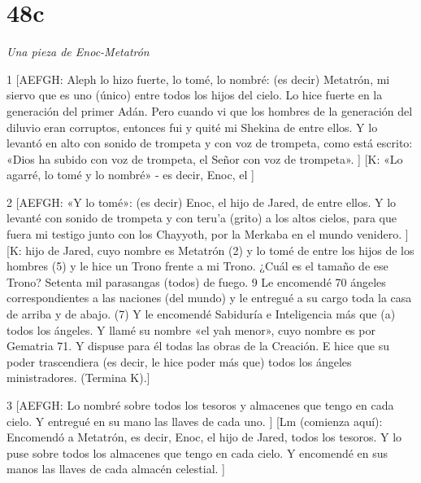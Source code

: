 \chapter{48c}

\par \textit{Una pieza de Enoc-Metatrón}

\par 1 [AEFGH: Aleph lo hizo fuerte, lo tomé, lo nombré: (es decir) Metatrón, mi siervo que es uno (único) entre todos los hijos del cielo. Lo hice fuerte en la generación del primer Adán. Pero cuando vi que los hombres de la generación del diluvio eran corruptos, entonces fui y quité mi Shekina de entre ellos. Y lo levantó en alto con sonido de trompeta y con voz de trompeta, como está escrito: «Dios ha subido con voz de trompeta, el Señor con voz de trompeta». ] [K: «Lo agarré, lo tomé y lo nombré» - es decir, Enoc, el ]


\par 2 [AEFGH: «Y lo tomé»: (es decir) Enoc, el hijo de Jared, de entre ellos. Y lo levanté con sonido de trompeta y con teru'a (grito) a los altos cielos, para que fuera mi testigo junto con los Chayyoth, por la Merkaba en el mundo venidero. ] [K: hijo de Jared, cuyo nombre es Metatrón (2) y lo tomé de entre los hijos de los hombres (5) y le hice un Trono frente a mi Trono. ¿Cuál es el tamaño de ese Trono? Setenta mil parasangas (todos) de fuego. 9 Le encomendé 70 ángeles correspondientes a las naciones (del mundo) y le entregué a su cargo toda la casa de arriba y de abajo. (7) Y le encomendé Sabiduría e Inteligencia más que (a) todos los ángeles. Y llamé su nombre «el yah menor», ​​cuyo nombre es por Gematria 71. Y dispuse para él todas las obras de la Creación. E hice que su poder trascendiera (es decir, le hice poder más que) todos los ángeles ministradores. (Termina K).]

\par 3 [AEFGH: Lo nombré sobre todos los tesoros y almacenes que tengo en cada cielo. Y entregué en su mano las llaves de cada uno. ] [Lm (comienza aquí): Encomendó a Metatrón, es decir, Enoc, el hijo de Jared, todos los tesoros. Y lo puse sobre todos los almacenes que tengo en cada cielo. Y encomendé en sus manos las llaves de cada almacén celestial. ]

